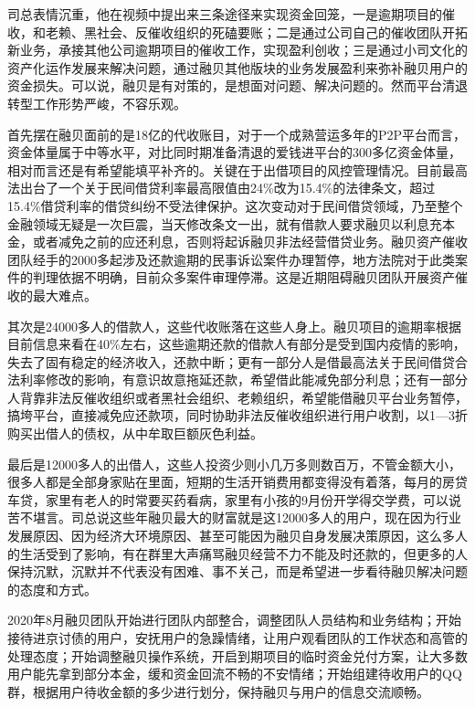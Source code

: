 \documentclass[
]{book}
\begin{document}
司总表情沉重，他在视频中提出来三条途径来实现资金回笼，一是逾期项目的催收，和老赖、黑社会、反催收组织的死磕要账；二是通过公司自己的催收团队开拓新业务，承接其他公司逾期项目的催收工作，实现盈利创收；三是通过小司文化的资产化运作发展来解决问题，通过融贝其他版块的业务发展盈利来弥补融贝用户的资金损失。可以说，融贝是有对策的，是想面对问题、解决问题的。然而平台清退转型工作形势严峻，不容乐观。

首先摆在融贝面前的是18亿的代收账目，对于一个成熟营运多年的P2P平台而言，资金体量属于中等水平，对比同时期准备清退的爱钱进平台的300多亿资金体量，相对而言还是有希望能填平补齐的。关键在于出借项目的风控管理情况。目前最高法出台了一个关于民间借贷利率最高限值由24\%改为15.4\%的法律条文，超过15.4\%借贷利率的借贷纠纷不受法律保护。这次变动对于民间借贷领域，乃至整个金融领域无疑是一次巨震，当天修改条文一出，就有借款人要求融贝以利息充本金，或者减免之前的应还利息，否则将起诉融贝非法经营借贷业务。融贝资产催收团队经手的2000多起涉及还款逾期的民事诉讼案件办理暂停，地方法院对于此类案件的判理依据不明确，目前众多案件审理停滞。这是近期阻碍融贝团队开展资产催收的最大难点。

其次是24000多人的借款人，这些代收账落在这些人身上。融贝项目的逾期率根据目前信息来看在40\%左右，这些逾期还款的借款人有部分是受到国内疫情的影响，失去了固有稳定的经济收入，还款中断；更有一部分人是借最高法关于民间借贷合法利率修改的影响，有意识故意拖延还款，希望借此能减免部分利息；还有一部分人背靠非法反催收组织或者黑社会组织、老赖组织，希望能借融贝平台业务暂停，搞垮平台，直接减免应还款项，同时协助非法反催收组织进行用户收割，以1---3折购买出借人的债权，从中牟取巨额灰色利益。

最后是12000多人的出借人，这些人投资少则小几万多则数百万，不管金额大小，很多人都是全部身家贴在里面，短期的生活开销费用都变得没有着落，每月的房贷车贷，家里有老人的时常要买药看病，家里有小孩的9月份开学得交学费，可以说苦不堪言。司总说这些年融贝最大的财富就是这12000多人的用户，现在因为行业发展原因、因为经济大环境原因、甚至可能因为融贝自身发展决策原因，这么多人的生活受到了影响，有在群里大声痛骂融贝经营不力不能及时还款的，但更多的人保持沉默，沉默并不代表没有困难、事不关己，而是希望进一步看待融贝解决问题的态度和方式。

2020年8月融贝团队开始进行团队内部整合，调整团队人员结构和业务结构；开始接待进京讨债的用户，安抚用户的急躁情绪，让用户观看团队的工作状态和高管的处理态度；开始调整融贝操作系统，开启到期项目的临时资金兑付方案，让大多数用户能先拿到部分本金，缓和资金回流不畅的不安情绪；开始组建待收用户的QQ群，根据用户待收金额的多少进行划分，保持融贝与用户的信息交流顺畅。
\end{document}
